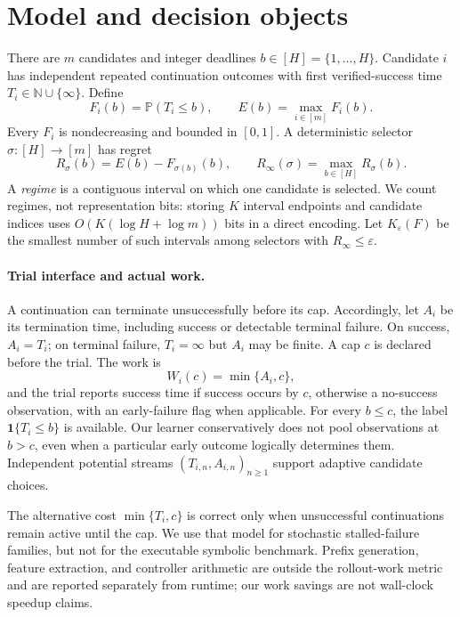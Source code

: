 \documentclass[11pt]{article}
\theoremstyle{definition}\newtheorem{definition}[theorem]{Definition}
\newcommand{\Pp}{\mathbb{P}}
\newcommand{\ind}{\mathbf{1}}
\newcommand{\eps}{\varepsilon}
\begin{document}
\section{Model and decision objects}\label{sec:model}
There are $m$ candidates and integer deadlines $b\in[H]=\{1,\ldots,H\}$. Candidate $i$ has independent repeated continuation outcomes with first verified-success time $T_i\in\mathbb{N}\cup\{\infty\}$. Define
\begin{equation}
 F_i(b)=\Pp(T_i\le b),\qquad E(b)=\max_{i\in[m]}F_i(b).
\end{equation}
Every $F_i$ is nondecreasing and bounded in $[0,1]$. A deterministic selector $\sigma:[H]\to[m]$ has regret
\begin{equation}
 R_\sigma(b)=E(b)-F_{\sigma(b)}(b),\qquad R_\infty(\sigma)=\max_{b\in[H]}R_\sigma(b).
\end{equation}
A \emph{regime} is a contiguous interval on which one candidate is selected. We count regimes, not representation bits: storing $K$ interval endpoints and candidate indices uses $O(K(\log H+\log m))$ bits in a direct encoding. Let $K_\eps(F)$ be the smallest number of such intervals among selectors with $R_\infty\le\eps$.

\paragraph{Trial interface and actual work.} A continuation can terminate unsuccessfully before its cap. Accordingly, let $A_i$ be its termination time, including success or detectable terminal failure. On success, $A_i=T_i$; on terminal failure, $T_i=\infty$ but $A_i$ may be finite. A cap $c$ is declared before the trial. The work is
\begin{equation}\label{eq:work}
 W_i(c)=\min\{A_i,c\},
\end{equation}
and the trial reports success time if success occurs by $c$, otherwise a no-success observation, with an early-failure flag when applicable. For every $b\le c$, the label $\ind\{T_i\le b\}$ is available. Our learner conservatively does not pool observations at $b>c$, even when a particular early outcome logically determines them. Independent potential streams $(T_{i,n},A_{i,n})_{n\ge1}$ support adaptive candidate choices.

The alternative cost $\min\{T_i,c\}$ is correct only when unsuccessful continuations remain active until the cap. We use that model for stochastic stalled-failure families, but not for the executable symbolic benchmark. Prefix generation, feature extraction, and controller arithmetic are outside the rollout-work metric and are reported separately from runtime; our work savings are not wall-clock speedup claims.
\end{document}
